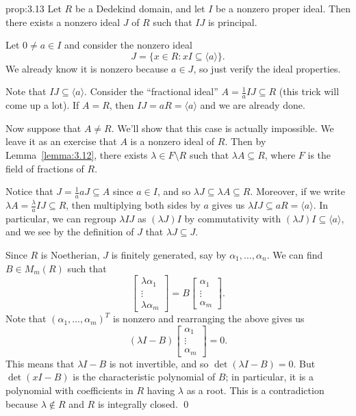 \begin{prop}{prop:3.13}
    Let $R$ be a Dedekind domain, and let $I$ be a nonzero proper ideal. 
    Then there exists a nonzero ideal $J$ of $R$ such that $IJ$ is principal.
\end{prop}\vspace{-0.25cm}\newpage 
\begin{pf}
    Let $0 \neq a \in I$ and consider the nonzero ideal 
    \[ J = \{x \in R : xI \subseteq \langle a \rangle\}. \] 
    We already know it is nonzero because $a \in J$, so just verify the ideal 
    properties. 
    
    Note that $IJ \subseteq \langle a \rangle$. Consider the ``fractional ideal'' 
    $A = \frac1a IJ \subseteq R$ (this trick will come up a lot). If $A = R$, 
    then $IJ = aR = \langle a \rangle$ and we are already done. 

    Now suppose that $A \neq R$. We'll show that this case is actually impossible. 
    We leave it as an exercise that $A$ is a nonzero ideal of $R$. Then by 
    Lemma~\ref{lemma:3.12}, there exists $\lambda \in F \setminus R$ 
    such that $\lambda A \subseteq R$, where $F$ is the field of 
    fractions of $R$. 

    Notice that $J = \frac1a aJ \subseteq A$ since $a \in I$, and so 
    $\lambda J \subseteq \lambda A \subseteq R$. Moreover, if we write 
    $\lambda A = \frac{\lambda}{a} IJ \subseteq R$, then multiplying 
    both sides by $a$ gives us $\lambda IJ \subseteq aR = \langle a \rangle$. 
    In particular, we can regroup $\lambda IJ$ as $(\lambda J)I$ by 
    commutativity with $(\lambda J)I \subseteq \langle a \rangle$, and we see 
    by the definition of $J$ that $\lambda J \subseteq J$.

    Since $R$ is Noetherian, $J$ is finitely generated, say by 
    $\alpha_1, \dots, \alpha_n$. We can find $B \in M_m(R)$ such that 
    \[ \begin{bmatrix} \lambda\alpha_1 \\ \vdots \\ \lambda\alpha_m \end{bmatrix} 
    = B \begin{bmatrix} \alpha_1 \\ \vdots \\ \alpha_m \end{bmatrix}. \] 
    Note that $(\alpha_1, \dots, \alpha_m)^T$ is nonzero and rearranging 
    the above gives us 
    \[ (\lambda I - B) \begin{bmatrix} \alpha_1 \\ \vdots \\ \alpha_m \end{bmatrix}
    = 0. \] 
    This means that $\lambda I - B$ is not invertible, and so 
    $\det(\lambda I - B) = 0$. But $\det(xI - B)$ is the characteristic 
    polynomial of $B$; in particular, it is a polynomial with coefficients 
    in $R$ having $\lambda$ as a root. This is a contradiction because 
    $\lambda \notin R$ and $R$ is integrally closed. \qed
\end{pf}\vspace{-0.25cm}

